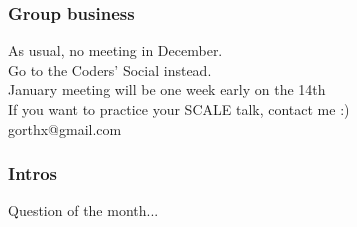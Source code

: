 \documentclass{beamer}
\begin{document}
\frame
{
  \frametitle{Group business}
  \begin{center}
As usual, no meeting in December.\\
Go to the Coders' Social instead.\\
\vspace{5mm}
January meeting will be one week early on the 14th\\
If you want to practice your SCALE talk, contact me :)\\
gorthx@gmail.com
  \end{center}
}


\frame
{
  \frametitle{Intros}
  \begin{center}
Question of the month...\\
  \end{center}
}
\end{document}
